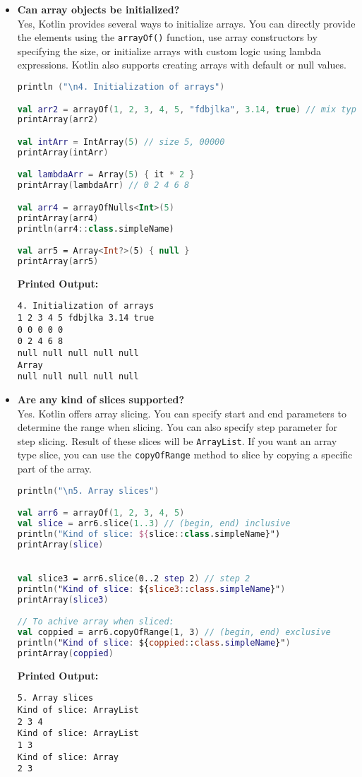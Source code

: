 \documentclass{article}
\begin{document}
\begin{itemize}
\item \textbf{Can array objects be initialized?} \\
Yes, Kotlin provides several ways to initialize arrays. You can directly provide the elements using the \texttt{arrayOf()} function, use array constructors by specifying the size, or initialize arrays with custom logic using lambda expressions. Kotlin also supports creating arrays with default or null values.
\begin{lstlisting}[language=Kotlin]
println ("\n4. Initialization of arrays")

val arr2 = arrayOf(1, 2, 3, 4, 5, "fdbjlka", 3.14, true) // mix type
printArray(arr2) 

val intArr = IntArray(5) // size 5, 00000
printArray(intArr)

val lambdaArr = Array(5) { it * 2 }
printArray(lambdaArr) // 0 2 4 6 8

val arr4 = arrayOfNulls<Int>(5)
printArray(arr4) 
println(arr4::class.simpleName)

val arr5 = Array<Int?>(5) { null }
printArray(arr5)
\end{lstlisting}
\textbf{Printed Output:}
\begin{verbatim}
4. Initialization of arrays
1 2 3 4 5 fdbjlka 3.14 true 
0 0 0 0 0 
0 2 4 6 8 
null null null null null 
Array
null null null null null
\end{verbatim}

    
    
\item \textbf{Are any kind of slices supported?} \\
Yes. Kotlin offers array slicing. You can specify start and end parameters to determine the range when slicing. You can also specify step parameter for step slicing. Result of these slices will be \texttt{ArrayList}. If you want an array type slice, you can use the \texttt{copyOfRange} method to slice by copying a specific part of the array.
\begin{lstlisting}[language=Kotlin]
println("\n5. Array slices")

val arr6 = arrayOf(1, 2, 3, 4, 5)
val slice = arr6.slice(1..3) // (begin, end) inclusive
println("Kind of slice: ${slice::class.simpleName}") 
printArray(slice)


val slice3 = arr6.slice(0..2 step 2) // step 2
println("Kind of slice: ${slice3::class.simpleName}") 
printArray(slice3)

// To achive array when sliced:
val coppied = arr6.copyOfRange(1, 3) // (begin, end) exclusive
println("Kind of slice: ${coppied::class.simpleName}") 
printArray(coppied)
\end{lstlisting}
\textbf{Printed Output:}
\begin{verbatim}
5. Array slices
Kind of slice: ArrayList
2 3 4 
Kind of slice: ArrayList
1 3 
Kind of slice: Array
2 3
\end{verbatim}





\end{itemize}
\end{document}
